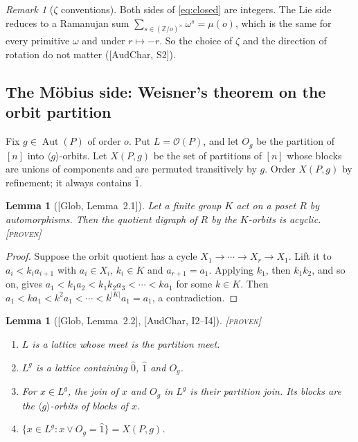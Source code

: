 \documentclass[11pt]{article}
\newtheorem{lemma}[theorem]{Lemma}
\theoremstyle{definition}
\theoremstyle{remark}
\newtheorem{remark}[theorem]{Remark}
\newcommand{\OP}{\mathcal O}
\newcommand{\Aut}{\operatorname{Aut}}
\newcommand{\st}[1]{\textup{[\textsc{#1}]}}
\begin{document}
\begin{remark}[$\zeta$ conventions]
Both sides of \eqref{eq:closed} are integers. The Lie side reduces to a
Ramanujan sum $\sum_{s\in(\mathbb Z/o)^\times}\omega^s=\mu(o)$, which is the
same for every primitive $\omega$ and under $r\mapsto-r$. So the choice of
$\zeta$ and the direction of rotation do not matter ([AudChar, S2]).
\end{remark}

\subsection{The M\"obius side: Weisner's theorem on the orbit partition}

Fix $g\in\Aut(P)$ of order $o$. Put $L=\OP(P)$, and let $O_g$ be the
partition of $[n]$ into $\langle g\rangle$-orbits. Let $X(P,g)$ be the set of
partitions of $[n]$ whose blocks are unions of components and are permuted
transitively by $g$. Order $X(P,g)$ by refinement; it always contains
$\hat1$.

\begin{lemma}[{[Glob, Lemma~2.1]}]\label{lem:orbitquot}
Let a finite group $K$ act on a poset $R$ by automorphisms. Then the quotient
digraph of $R$ by the $K$-orbits is acyclic. \st{proven}
\end{lemma}

\begin{proof}
Suppose the orbit quotient has a cycle $X_1\to\cdots\to X_r\to X_1$. Lift it
to $a_i<k_ia_{i+1}$ with $a_i\in X_i$, $k_i\in K$ and $a_{r+1}=a_1$. Applying
$k_1$, then $k_1k_2$, and so on, gives
$a_1<k_1a_2<k_1k_2a_3<\cdots<ka_1$ for some $k\in K$. Then
$a_1<ka_1<k^2a_1<\cdots<k^{|K|}a_1=a_1$, a contradiction.
\end{proof}

\begin{lemma}[{[Glob, Lemma~2.2]}, {[AudChar, I2--I4]}]\label{lem:lattice}
\st{proven}
\begin{enumerate}[label=(\roman*)]
\item $L$ is a lattice whose meet is the partition meet.
\item $L^g$ is a lattice containing $\hat0$, $\hat1$ and $O_g$.
\item For $x\in L^g$, the join of $x$ and $O_g$ in $L^g$ is their partition
  join. Its blocks are the $\langle g\rangle$-orbits of blocks of $x$.
\item $\{x\in L^g:x\vee O_g=\hat1\}=X(P,g)$.
\end{enumerate}
\end{lemma}
\end{document}
